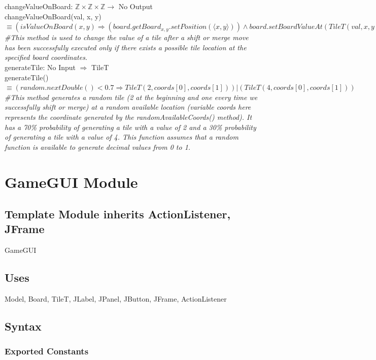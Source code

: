 \documentclass[12pt]{article}
\begin{document}
\noindent changeValueOnBoard: $\mathbb{Z} \times \mathbb{Z} \times \mathbb{Z}\rightarrow$ No Output\\
\noindent
changeValueOnBoard(val, x, y) $\equiv (isValueOnBoard(x, y) \Rightarrow (board.getBoard_{x,y}.setPosition(\langle x,y \rangle)) \land board.setBoardValueAt(TileT(val, x, y)))$\\
\textit{\#This method is used to change the value of a tile after a shift or merge move has been successfully executed only if there exists a possible tile location at the specified board coordinates.}
~\\

\noindent generateTile: No Input $\Rightarrow$ TileT\\
\noindent
generateTile() $\equiv (random.nextDouble() < 0.7 \Rightarrow TileT(2, coords[0], coords[1])) \vert (TileT(4, coords[0], coords[1]))$
\textit{\#This method generates a random tile (2 at the beginning and one every time we successfully shift or merge) at a random available location (variable coords here represents the coordinate generated by the randomAvailableCoords() method). It has a 70\% probability of generating a tile with a value of 2 and a 30\% probability of generating a tile with a value of 4. This function assumes that a random function is available to generate decimal values from 0 to 1.}
~\\

\newpage

\section* {GameGUI Module}

\subsection*{Template Module inherits ActionListener, JFrame}

GameGUI

\subsection* {Uses}

Model, Board, TileT, JLabel, JPanel, JButton, JFrame, ActionListener

\subsection* {Syntax}

\subsubsection* {Exported Constants}
\end{document}
